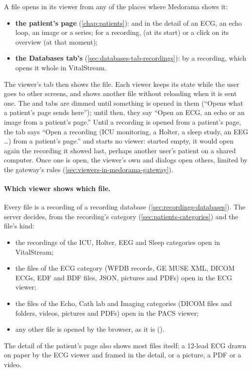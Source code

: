 A file opens in its viewer from any of the places where Medorama shows it:
\begin{itemize}
\item \textbf{the patient's page} (\cref{chap:patients}):  and 
  in the detail of an ECG, an echo loop, an image or a series; for a recording,  (at its start) or a click on its overview (at that moment);
\item \textbf{the Databases tab's } (\cref{sec:databases-tab-recordings}):
   by a recording, which opens it whole in VitalStream.
\end{itemize}

The viewer's tab then shows the file. Each viewer keeps its state while the user goes to other
screens, and shows another file without reloading when it is sent one. The 
and  tabs are dimmed until something is opened in them (``Opens what a patient's page
sends here''); until then, they say ``Open an ECG, an echo or an image from a patient's page.''
Until a recording is opened from a patient's page, the  tab says ``Open a
recording (ICU monitoring, a Holter, a sleep study, an EEG \ldots) from a patient's page.'' and
starts no viewer: started empty, it would open again the recording it showed last, perhaps
another user's patient on a shared computer. Once one is open, the viewer's own
 and  dialogs open others, limited by the
gateway's rules (\cref{sec:viewers-in-medorama-gateway}).

\paragraph{Which viewer shows which file.} Every file is a recording of a recording database
(\cref{sec:recordings-databases}). The server decides, from the recording's category
(\cref{sec:patients-categories}) and the file's kind:
\begin{itemize}
\item the recordings of the ICU, Holter, EEG and Sleep categories open in VitalStream;
\item the files of the ECG category (WFDB records, GE MUSE XML, DICOM ECGs, EDF and BDF files,
  JSON, pictures and PDFs) open in the ECG viewer;
\item the files of the Echo, Cath lab and Imaging categories (DICOM files and folders, videos,
  pictures and PDFs) open in the PACS viewer;
\item any other file is opened by the browser, as it is ().
\end{itemize}
The detail of the patient's page also shows most files itself: a 12-lead ECG drawn on paper by
the ECG viewer and framed in the detail, or a picture, a PDF or a video.

